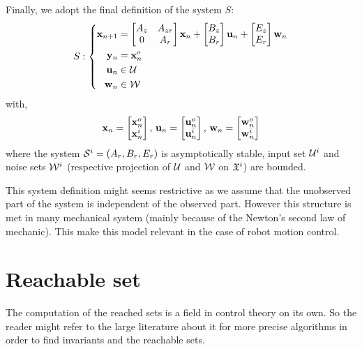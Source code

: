 Finally, we adopt the final definition of the system $S$:
\begin{equation}
S:
\left\{
\begin{aligned}
 \mathbf{x}_{n+1} &= 
\begin{bmatrix} A_z & A_{zr}\\ 0 & A_r \end{bmatrix}  \mathbf{x}_n
+\begin{bmatrix} B_z \\ B_r \end{bmatrix}  \mathbf{u}_n
+\begin{bmatrix} E_z\\ E_r \end{bmatrix}  \mathbf{w}_n\\
 \mathbf{y}_n &=  \mathbf{x}^o_n \\
 \mathbf{u}_n &\in \mathcal{U} \\
 \mathbf{w}_n &\in \mathcal{W} \\
\end{aligned}
\right.
\end{equation}
with,
\begin{align*}
 \mathbf{x}_n = \begin{bmatrix}
 \mathbf{x}^o_n\\
 \mathbf{x}^i_n
\end{bmatrix}
\textrm{, }
 \mathbf{u}_n = \begin{bmatrix}
 \mathbf{u}^o_n\\
 \mathbf{u}^i_n
\end{bmatrix}
\textrm{, }
 \mathbf{w}_n = \begin{bmatrix}
 \mathbf{w}^o_n\\
 \mathbf{w}^i_n
\end{bmatrix}
\end{align*}
where the system $\mathcal{S}^i=(A_r,B_r,E_r)$ is asymptotically stable, input set ${\mathcal{U}^i}$ and noise sets ${\mathcal{W}^i}$ (respective projection of $\mathcal{U}$ and $\mathcal{W}$ on $\mathfrak{X}^i$) are bounded.

This system definition might seems restrictive as we assume that the unobserved part of the system is independent of the observed part.
However this structure is met in many mechanical system (mainly because of the Newton's second law of mechanic).
This make this model relevant in the case of robot motion control.

\section{Reachable set}
The computation of the reached sets is a field in control theory on its own.
So the reader might refer to the large literature about it for more precise algorithms in order to find invariants and the reachable sets.

